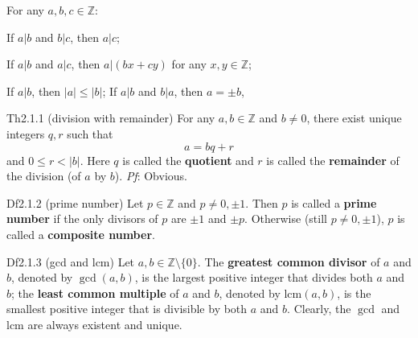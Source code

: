\documentclass{article}
\newcommand{\lcm}{\text{lcm}}
\begin{document}
\begin{Rmk}{}
    \begin{compactenum}
        \item \textcolor{Th}{For any $a, b, c\in\mathbb{Z}$:
        \begin{compactenum}
            \item If $a|b$ and $b|c$, then $a|c$;
            \item If $a|b$ and $a|c$, then $a|(bx+cy)$ for any $x, y\in\mathbb{Z}$;
            \item If $a|b$, then $|a|\leq |b|$; If $a|b$ and $b|a$, then $a = \pm b$,
        \end{compactenum}}
    \end{compactenum}
\end{Rmk}

\begin{Th}{Th2.1.1 (division with remainder)}
    For any $a, b\in\mathbb{Z}$ and $b\neq 0$, there exist unique integers $q, r$ such that
    $$a = bq + r$$
    and $0\leq r < |b|$. \textcolor{Df}{Here $q$ is called the \textbf{quotient} and $r$ is called the \textbf{remainder} of the division (of $a$ by $b$).}
    \tcblower
    \textit{Pf}: Obvious.
\end{Th}

\begin{Df}{Df2.1.2 (prime number)}
    Let $p\in\mathbb{Z}$ and $p\neq 0, \pm 1$. Then $p$ is called a \textbf{prime number} if the only divisors of $p$ are $\pm 1$ and $\pm p$. Otherwise (still $p\neq 0, \pm 1$), $p$ is called a \textbf{composite number}.
\end{Df}

\begin{Df}{Df2.1.3 (gcd and lcm)}
    Let $a, b\in\mathbb{Z}\setminus \{0\}$. The \textbf{greatest common divisor} of $a$ and $b$, denoted by $\gcd(a, b)$, is the largest positive integer that divides both $a$ and $b$; the \textbf{least common multiple} of $a$ and $b$, denoted by $\lcm(a, b)$, is the smallest positive integer that is divisible by both $a$ and $b$. \textcolor{Th}{Clearly, the $\gcd$ and $\lcm$ are always existent and unique.}
\end{Df}
\end{document}
